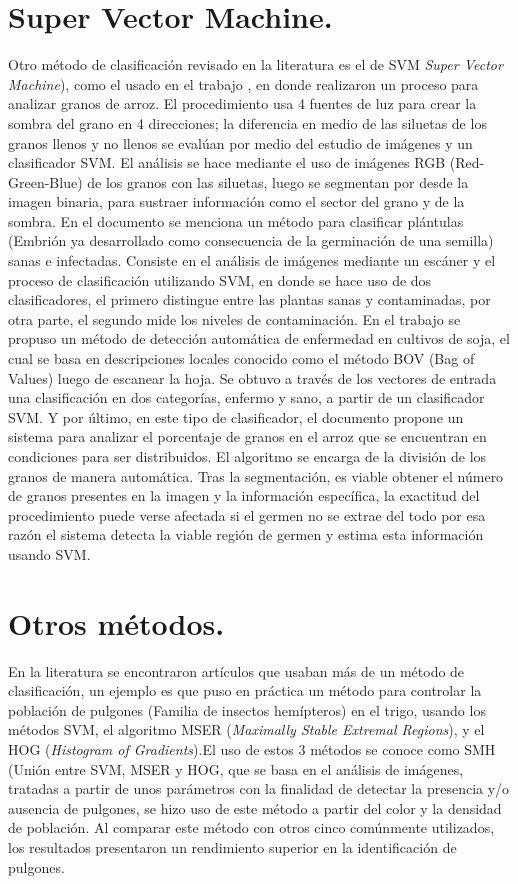 \section{Super Vector Machine.}
	Otro método de clasificación revisado en la literatura es el de SVM \textit{Super Vector Machine}), como el usado en el trabajo \cite{LIU201679}, en donde realizaron un proceso para analizar granos de arroz. El procedimiento usa 4 fuentes de luz para crear la sombra del grano en 4 direcciones; la diferencia en medio de las siluetas de los granos llenos y no llenos se evalúan por medio del estudio de imágenes y un clasificador SVM. El análisis se hace mediante el uso de imágenes RGB (Red-Green-Blue) de los granos con las siluetas, luego se segmentan por  desde la imagen binaria, para sustraer información como el sector del grano y de la sombra. En el documento \cite{CHUNG2016404} se menciona un método para clasificar plántulas (Embrión ya desarrollado como consecuencia de la germinación de una semilla) sanas e infectadas. Consiste en el análisis de imágenes mediante un escáner y el proceso de clasificación utilizando SVM, en donde se hace uso de dos clasificadores, el primero distingue entre las plantas sanas y contaminadas, por otra parte, el segundo mide los niveles de contaminación. En el trabajo \cite{PIRES201648} se propuso un método de detección automática de enfermedad en cultivos de soja, el cual se basa en descripciones locales conocido como el método BOV (Bag of Values) luego de escanear la hoja. Se obtuvo a través de los vectores de entrada una clasificación en dos categorías, enfermo y sano, a partir de un clasificador SVM. Y por último, en este tipo de clasificador, el documento \cite{SUN2014426} propone un sistema para analizar el porcentaje de granos en el arroz que se encuentran en condiciones para ser distribuidos. El algoritmo se encarga de la división de los granos de manera automática. Tras la segmentación, es viable obtener el número de granos presentes en la imagen y la información específica, la exactitud del procedimiento puede verse afectada si el germen no se extrae del todo por esa razón el sistema detecta la viable región de germen y estima esta información usando SVM.\\

\section{Otros métodos.}
	En la literatura se encontraron artículos que usaban más de un método de clasificación, un ejemplo es \cite{LIU201682} que puso en práctica un método para controlar la población de pulgones (Familia de insectos hemípteros) en el trigo, usando los métodos SVM, el algoritmo MSER (\textit{Maximally Stable Extremal Regions}), y el HOG (\textit{Histogram of Gradients}).El uso de estos 3 métodos se conoce como SMH (Unión entre SVM, MSER y HOG, que se basa en el análisis de imágenes, tratadas a partir de unos parámetros con la finalidad de detectar la presencia y/o ausencia de pulgones, se hizo uso de este método a partir del color y la densidad de población. Al comparar este método con otros cinco comúnmente utilizados, los resultados presentaron un rendimiento superior en la identificación de pulgones. \\
	
